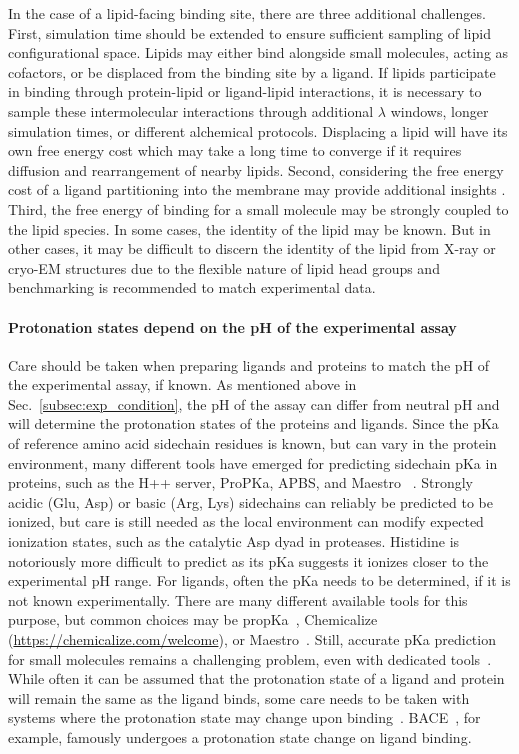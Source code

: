 \documentclass[9pt,bestpractices]{livecoms}
\begin{document}
In the case of a lipid-facing binding site, there are three additional challenges. First, simulation time should be extended to ensure sufficient sampling of lipid configurational space. Lipids may either bind alongside small molecules, acting as cofactors, or be displaced from the binding site by a ligand. If lipids participate in binding through protein-lipid or ligand-lipid interactions, it is necessary to sample these intermolecular interactions through additional $\lambda$ windows, longer simulation times, or different alchemical protocols. Displacing a lipid will have its own free energy cost which may take a long time to converge if it requires diffusion and rearrangement of nearby lipids. Second, considering the free energy cost of a ligand partitioning into the membrane may provide additional insights \cite{doi:10.1021/acs.jcim.1c01147}. Third, the free energy of binding for a small molecule may be strongly coupled to the lipid species. In some cases, the identity of the lipid may be known. But in other cases, it may be difficult to discern the identity of the lipid from X-ray or cryo-EM structures due to the flexible nature of lipid head groups and benchmarking is recommended to match experimental data.

\paragraph{Protonation states depend on the pH of the experimental assay}
Care should be taken when preparing ligands and proteins to match the pH of the experimental assay, if known. As mentioned above in Sec.~\ref{subsec:exp_condition}, the pH of the assay can differ from neutral pH and will determine the protonation states of the proteins and ligands. Since the pKa of reference amino acid sidechain residues is known, but can vary in the protein environment, many different tools have emerged for predicting sidechain pKa in proteins, such as the H++ server, ProPKa, APBS, and Maestro ~\cite{anandakrishnan2012automating, sondergaard2011improved, jurrus2018improvements, 2020schrodinger}. Strongly acidic (Glu, Asp) or basic (Arg, Lys) sidechains can reliably be predicted to be ionized, but care is still needed as the local environment can modify expected ionization states, such as  the catalytic Asp dyad in proteases. Histidine is notoriously more difficult to predict as its pKa suggests it ionizes closer to the experimental pH range. For ligands, often the pKa needs to be determined, if it is not known experimentally. There are many different available tools for this purpose, but common choices may be propKa~\cite{olsson2011propka3,sondergaard2011improved}, Chemicalize (\url{https://chemicalize.com/welcome}), or Maestro~\cite{2020schrodinger}. Still, accurate pKa prediction for small molecules remains a challenging problem, even with dedicated tools~\cite{isik2018pka}. While often it can be assumed that the protonation state of a ligand and protein will remain the same as the ligand binds, some care needs to be taken with systems where the protonation state may change upon binding~\cite{onufriev2013protonation}. BACE~\cite{kim2015conformational}, for example, famously undergoes a protonation state change on ligand binding.
\end{document}
